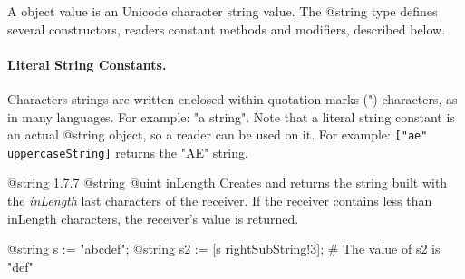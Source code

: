 

A  object value is an Unicode character string value. The @string type defines several constructors, readers constant methods and modifiers, described below.

\paragraph{Literal String Constants.}

Characters strings are written enclosed within quotation marks (") characters, as in many languages. For example: "a string". Note that a literal string constant is an actual @string object, so a reader can be used on it. For example: \lstinline[language=galgas]{["ae" uppercaseString]} returns the "AE" string.

{@string}
{1.7.7}
{@string}
{@uint inLength}
{Creates and returns the string built with the \emph{inLength} last characters of the receiver. If the receiver contains less than inLength characters, the receiver’s value is returned.}
{}

\begin{exemple}
@string s := "abcdef";
@string s2 := [s rightSubString!3]; # The value of s2 is "def"
\end{exemple}

